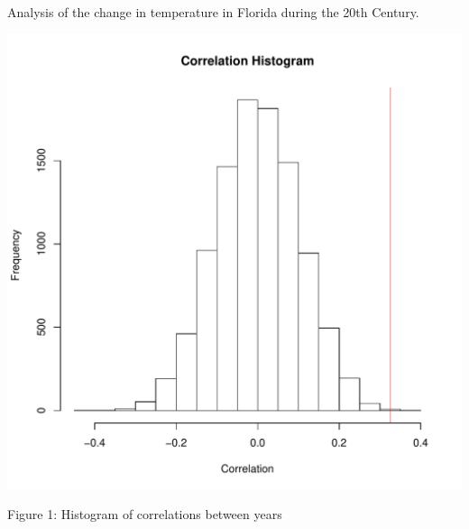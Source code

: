 \documentclass{article}
\begin{document}
Analysis of the change in temperature in Florida during the 20th Century.
 
\includegraphics[width=\textwidth, height=\textheight, keepaspectratio]{rplot}
 
Figure 1: Histogram of correlations between years
\end{document}
